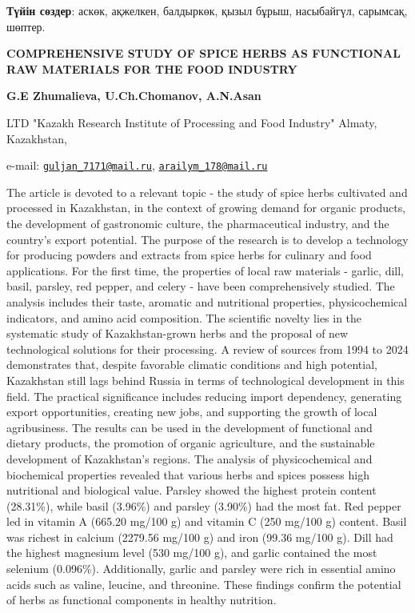 {\bfseries Түйін сөздер}: аскөк, ақжелкен, балдыркөк, қызыл бұрыш,
насыбайгүл, сарымсақ, шөптер.

\begin{articleheader}
{\bfseries COMPREHENSIVE STUDY OF SPICE HERBS AS FUNCTIONAL RAW MATERIALS
FOR THE FOOD INDUSTRY}

{\bfseries
G.E Zhumalieva\textsuperscript{\envelope },
U.Ch.Chomanov,
A.N.Asan\textsuperscript{\envelope }
}
\end{articleheader}

\begin{affiliation}
LTD "Kazakh Research Institute of Processing and Food Industry" Almaty, Kazakhstan,

e-mail:
\href{mailto:guljan\_7171@mail.ru}{\nolinkurl{guljan\_7171@mail.ru}},
\href{mailto:arailym\_178@mail.ru}{\nolinkurl{arailym\_178@mail.ru}}
\end{affiliation}

The article is devoted to a relevant topic - the study of spice herbs
cultivated and processed in Kazakhstan, in the context of growing demand
for organic products, the development of gastronomic culture, the
pharmaceutical industry, and the country's export potential. The purpose
of the research is to develop a technology for producing powders and
extracts from spice herbs for culinary and food applications. For the
first time, the properties of local raw materials - garlic, dill, basil,
parsley, red pepper, and celery - have been comprehensively studied. The
analysis includes their taste, aromatic and nutritional properties,
physicochemical indicators, and amino acid composition. The scientific
novelty lies in the systematic study of Kazakhstan-grown herbs and the
proposal of new technological solutions for their processing. A review
of sources from 1994 to 2024 demonstrates that, despite favorable
climatic conditions and high potential, Kazakhstan still lags behind
Russia in terms of technological development in this field. The
practical significance includes reducing import dependency, generating
export opportunities, creating new jobs, and supporting the growth of
local agribusiness. The results can be used in the development of
functional and dietary products, the promotion of organic agriculture,
and the sustainable development of Kazakhstan's regions. The analysis of
physicochemical and biochemical properties revealed that various herbs
and spices possess high nutritional and biological value. Parsley showed
the highest protein content (28.31\%), while basil (3.96\%) and parsley
(3.90\%) had the most fat. Red pepper led in vitamin A (665.20 mg/100 g)
and vitamin C (250 mg/100 g) content. Basil was richest in calcium
(2279.56 mg/100 g) and iron (99.36 mg/100 g). Dill had the highest
magnesium level (530 mg/100 g), and garlic contained the most selenium
(0.096\%). Additionally, garlic and parsley were rich in essential amino
acids such as valine, leucine, and threonine. These findings confirm the
potential of herbs as functional components in healthy nutrition.

